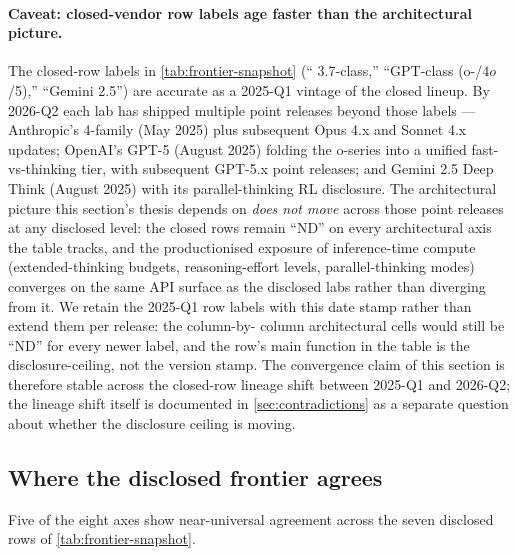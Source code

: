 \paragraph{Caveat: closed-vendor row labels age faster than the
architectural picture.} The closed-row labels in
\cref{tab:frontier-snapshot} (`` 3.7-class,'' ``GPT-class
(o-/$\!4o$/5),'' ``Gemini 2.5'') are accurate as a 2025-Q1 vintage of
the closed lineup. By 2026-Q2 each lab has shipped multiple point
releases beyond those labels --- Anthropic's  4-family
(May 2025) plus subsequent Opus 4.x and Sonnet 4.x updates; OpenAI's
GPT-5 (August 2025) folding the o-series into a unified
fast-vs-thinking tier, with subsequent GPT-5.x point releases; and
Gemini 2.5 Deep Think (August 2025) with its parallel-thinking RL
disclosure. The architectural picture this section's thesis depends on
\emph{does not move} across those point releases at any disclosed
level: the closed rows remain ``ND'' on every architectural axis the
table tracks, and the productionised exposure of inference-time
compute (extended-thinking budgets, reasoning-effort levels,
parallel-thinking modes) converges on the same API surface as the
disclosed labs rather than diverging from it. We retain the 2025-Q1 row labels with
this date stamp rather than extend them per release: the column-by-
column architectural cells would still be ``ND'' for every newer
label, and the row's main function in the table is the
disclosure-ceiling, not the version stamp. The convergence claim of
this section is therefore stable across the closed-row lineage shift
between 2025-Q1 and 2026-Q2; the lineage shift itself is documented
in \cref{sec:contradictions} as a separate question about whether the
disclosure ceiling is moving.

\subsection{Where the disclosed frontier agrees}
\label{sec:snapshot-agreement}

Five of the eight axes show near-universal agreement across the
seven disclosed rows of \cref{tab:frontier-snapshot}.

